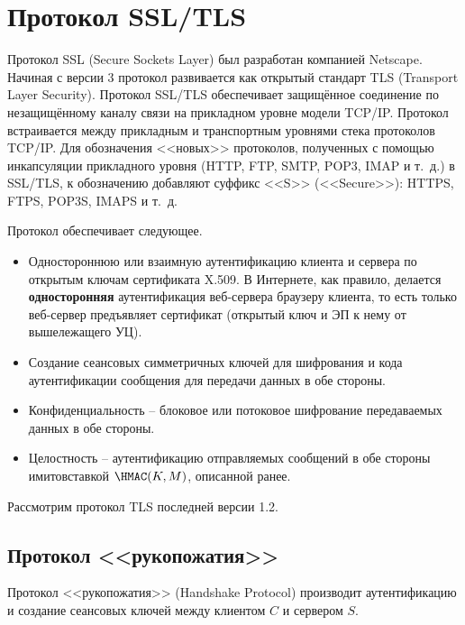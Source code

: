 \section{Протокол SSL/TLS}

Протокол SSL (Secure Sockets Layer) был разработан компанией Netscape. Начиная с версии 3 протокол развивается как открытый стандарт TLS (Transport Layer Security). Протокол SSL/TLS обеспечивает защищённое соединение по незащищённому каналу связи на прикладном уровне модели TCP/IP. Протокол встраивается между прикладным и транспортным уровнями стека протоколов TCP/IP. Для обозначения <<новых>> протоколов, полученных с помощью инкапсуляции прикладного уровня (HTTP, FTP, SMTP, POP3, IMAP и т.~д.) в SSL/TLS, к обозначению добавляют суффикс <<S>> (<<Secure>>): HTTPS, FTPS, POP3S, IMAPS и т.~д.

Протокол обеспечивает следующее.
\begin{itemize}
    \item Одностороннюю или взаимную аутентификацию клиента и сервера по открытым ключам сертификата X.509. В Интернете, как правило, делается \textbf{односторонняя} аутентификация веб-сервера браузеру клиента, то есть только веб-сервер предъявляет сертификат (открытый ключ и ЭП к нему от вышележащего УЦ).
    \item Создание сеансовых симметричных ключей для шифрования и кода аутентификации сообщения для передачи данных в обе стороны.
    \item Конфиденциальность -- блоковое или потоковое шифрование передаваемых данных в обе стороны.
    \item Целостность -- аутентификацию отправляемых сообщений в обе стороны имитовставкой $\HMAC(K,M)$, описанной ранее.
\end{itemize}

Рассмотрим протокол TLS последней версии 1.2.


\subsection{Протокол <<рукопожатия>>}

Протокол <<рукопожатия>> (Handshake Protocol) производит аутентификацию и создание сеансовых ключей между клиентом $C$ и сервером $S$.

